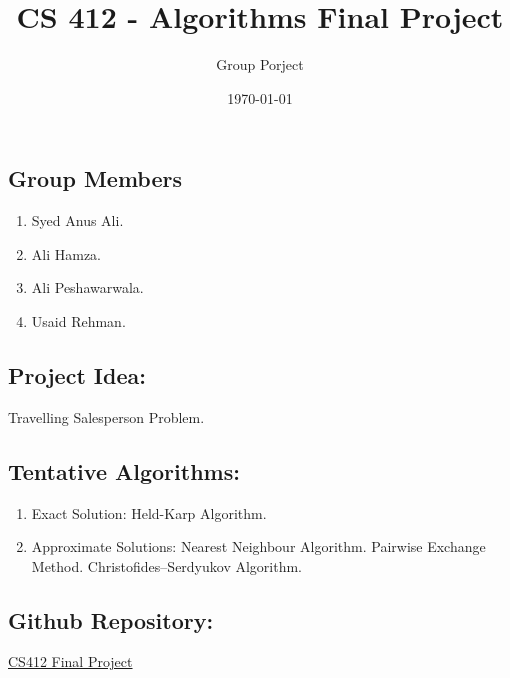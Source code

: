\documentclass{article}
\title{CS 412 - Algorithms Final Project}
\author{Group Porject}
\date{\today}
\begin{document}
    \maketitle
\subsection*{Group Members}
\begin{enumerate}
    \item Syed Anus Ali.
    \item Ali Hamza.
    \item Ali Peshawarwala.
    \item Usaid Rehman.
\end{enumerate}
\subsection*{Project Idea:}
\begin{flushleft}
	Travelling Salesperson Problem.
\end{flushleft}
 
\subsection*{Tentative Algorithms:}
\begin{enumerate}
	\item Exact Solution:
		\subitem Held-Karp Algorithm.
	\item Approximate Solutions:
		\subitem Nearest Neighbour Algorithm.
		\subitem Pairwise Exchange Method.
		\subitem Christofides–Serdyukov Algorithm.
\end{enumerate}
   
\subsection*{Github Repository:}
\begin{flushleft}
\href{github.com/hurryingauto3/CS412-Algorithms-Final-Projec}{CS412 Final Project}	
\end{flushleft}
	
\end{document}
